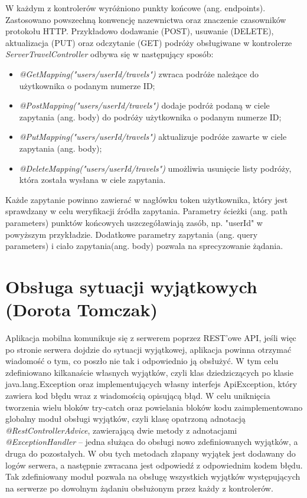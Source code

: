 \documentclass[10pt,twoside,a4paper]{report}
\begin{document}
\par W każdym z kontrolerów wyróżniono punkty końcowe (ang. endpoints). Zastosowano powszechną konwencję nazewnictwa oraz znaczenie czasowników protokołu HTTP. Przykładowo dodawanie (POST), usuwanie (DELETE), aktualizacja (PUT) oraz odczytanie (GET) podróży obsługiwane w kontrolerze \textit{ServerTravelController} odbywa się w następujący sposób:
\begin{itemize}
\item \textit{@GetMapping("users/{userId}/travels")} zwraca podróże należące do użytkownika o podanym numerze ID;
\item \textit{@PostMapping("users/{userId}/travels")} dodaje podróż podaną w ciele zapytania (ang. body) do podróży użytkownika o podanym numerze ID;
\item \textit{@PutMapping("users/{userId}/travels")} aktualizuje podróże zawarte w ciele zapytania (ang. body);
\item \textit{@DeleteMapping("users/{userId}/travels")} umożliwia usunięcie listy podróży, która została wysłana w ciele zapytania.
\end{itemize}

\par Każde zapytanie powinno zawierać w nagłówku token użytkownika, który jest sprawdzany w celu weryfikacji źródła zapytania. Parametry ścieżki (ang. path parameters) punktów końcowych uszczegóławiają zasób, np. "userId" w powyższym przykładzie. Dodatkowe parametry zapytania (ang. query parameters) i ciało zapytania(ang. body)  pozwala na sprecyzowanie żądania.

\section{Obsługa sytuacji wyjątkowych (Dorota Tomczak)}
\par Aplikacja mobilna komunikuje się z serwerem poprzez REST'owe API, jeśli więc po stronie serwera dojdzie do sytuacji wyjątkowej, aplikacja powinna otrzymać wiadomość o tym, co poszło nie tak i odpowiednio ją obsłużyć. W tym celu zdefiniowano kilkanaście własnych wyjątków, czyli klas dziedziczących po klasie java.lang.Exception oraz implementujących własny interfejs ApiException, który zawiera kod błędu wraz z wiadomością opisującą błąd. W celu uniknięcia tworzenia wielu bloków try-catch oraz powielania bloków kodu zaimplementowano globalny moduł obsługi wyjątków, czyli klasę opatrzoną adnotacją \textit{@RestControllerAdvice}, zawierającą dwie metody z adnotacjami \textit{@ExceptionHandler} – jedna służąca do obsługi nowo zdefiniowanych wyjątków, a druga do pozostałych. W obu tych metodach złapany wyjątek jest dodawany do logów serwera, a następnie zwracana jest odpowiedź z odpowiednim kodem błędu. Tak zdefiniowany moduł pozwala na obsługę wszystkich wyjątków występujących na serwerze po dowolnym żądaniu obsłużonym przez każdy z kontrolerów.
\end{document}
